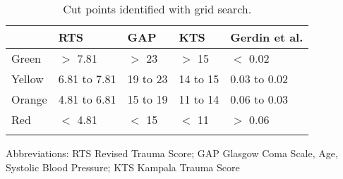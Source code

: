 \begin{table}[!ht]
\centering
\caption{Cut points identified with grid search.} 
\label{table:cut_points}
\begin{adjustbox}{max width = \linewidth} 
\begin{threeparttable} 
\begin{tabular} 
{lllll}
  \toprule
 & RTS & GAP & KTS & Gerdin et al. \\ 
  \midrule
Green & $>$ 7.81 & $>$ 23 & $>$ 15 & $<$ 0.02 \\ 
  Yellow & 6.81 to 7.81 & 19 to 23 & 14 to 15 & 0.03 to 0.02 \\ 
  Orange & 4.81 to 6.81 & 15 to 19 & 11 to 14 & 0.06 to 0.03 \\ 
  Red & $<$ 4.81 & $<$ 15 & $<$ 11 & $>$ 0.06 \\ 
   \bottomrule
\addlinespace 
\end{tabular} 
\begin{tablenotes} \footnotesize 
\item Abbreviations: RTS Revised Trauma Score; GAP Glasgow Coma Scale, Age, Systolic Blood Pressure; KTS Kampala Trauma Score
\end{tablenotes} 
\end{threeparttable} 
\end{adjustbox}
\end{table}

